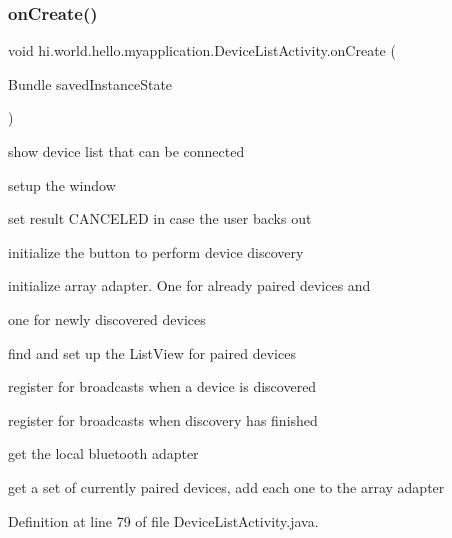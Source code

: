 \subsubsection{\texorpdfstring{onCreate()}{onCreate()}}
{\footnotesize\ttfamily void hi.\+world.\+hello.\+myapplication.\+Device\+List\+Activity.\+on\+Create (\begin{DoxyParamCaption}\item[{Bundle}]{saved\+Instance\+State }\end{DoxyParamCaption})\hspace{0.3cm}{\ttfamily [protected]}}



show device list that can be connected 


\begin{DoxyItemize}
\item setup the window
\item set result C\+A\+N\+C\+E\+L\+ED in case the user backs out
\item initialize the button to perform device discovery
\item initialize array adapter. One for already paired devices and
\item one for newly discovered devices
\item find and set up the List\+View for paired devices
\item register for broadcasts when a device is discovered
\item register for broadcasts when discovery has finished
\item get the local bluetooth adapter
\item get a set of currently paired devices, add each one to the array adapter 
\end{DoxyItemize}

Definition at line 79 of file Device\+List\+Activity.\+java.


